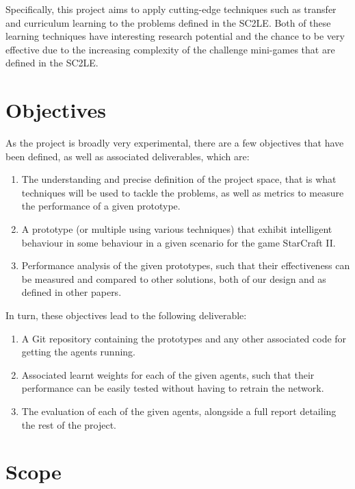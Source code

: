 Specifically, this project aims to apply cutting-edge techniques such as
transfer and curriculum learning to the problems defined in the SC2LE\@.  Both
of these learning techniques have interesting research potential and the chance
to be very effective due to the increasing complexity of the challenge
mini-games that are defined in the SC2LE\@.

\section{Objectives}

As the project is broadly very experimental, there are a few objectives that
have been defined, as well as associated deliverables, which are:

\begin{enumerate}
    \item The understanding and precise definition of the project space, that is
        what techniques will be used to tackle the problems, as well as
        metrics to measure the performance of a given prototype.
    \item A prototype (or multiple using various techniques) that exhibit
        intelligent behaviour in some behaviour in a given scenario for
        the game StarCraft II\@.
    \item Performance analysis of the given prototypes, such that their
        effectiveness can be measured and compared to other solutions, both of
        our design and as defined in other papers.
\end{enumerate}

In turn, these objectives lead to the following deliverable:

\begin{enumerate}
    \item A Git repository containing the prototypes and any other associated
        code for getting the agents running.
    \item Associated learnt weights for each of the given agents, such that
        their performance can be easily tested without having to retrain
        the network.
    \item The evaluation of each of the given agents, alongside a full report
        detailing the rest of the project.
\end{enumerate}

\section{Scope}

